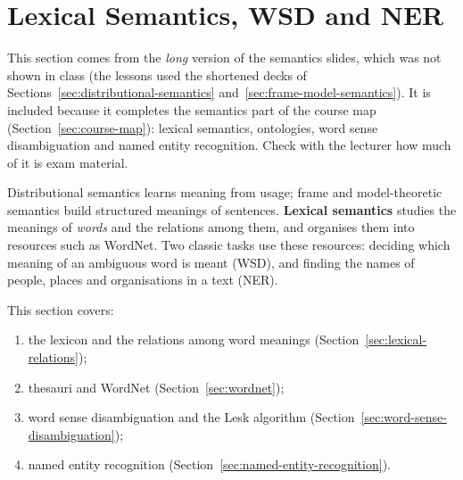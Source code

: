\section{Lexical Semantics, WSD and NER}
\label{sec:lexical-semantics}

\begin{nbwarning}
This section comes from the \emph{long} version of the semantics slides, which was not
shown in class (the lessons used the shortened decks of
Sections~\ref{sec:distributional-semantics} and~\ref{sec:frame-model-semantics}). It is
included because it completes the semantics part of the course map
(Section~\ref{sec:course-map}): lexical semantics, ontologies, word sense
disambiguation and named entity recognition. Check with the lecturer how much of it is
exam material.
\end{nbwarning}

Distributional semantics learns meaning from usage; frame and model-theoretic semantics
build structured meanings of sentences. \textbf{Lexical semantics} studies the meanings
of \emph{words} and the relations among them, and organises them into resources such as
WordNet. Two classic tasks use these resources: deciding which meaning of an ambiguous
word is meant (WSD), and finding the names of people, places and organisations in a text
(NER).

This section covers:
\begin{enumerate}[nosep]
  \item the lexicon and the relations among word meanings
        (Section~\ref{sec:lexical-relations});
  \item thesauri and WordNet (Section~\ref{sec:wordnet});
  \item word sense disambiguation and the Lesk algorithm
        (Section~\ref{sec:word-sense-disambiguation});
  \item named entity recognition (Section~\ref{sec:named-entity-recognition}).
\end{enumerate}





